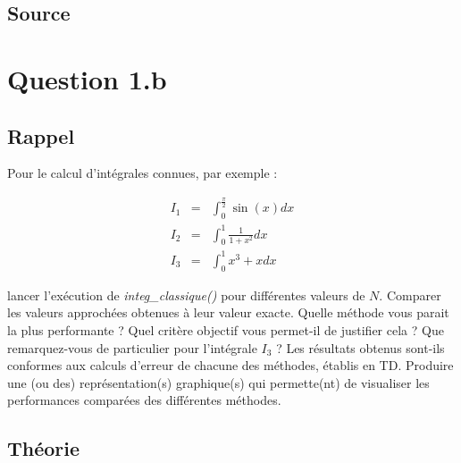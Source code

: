 \documentclass[a4paper,10pt]{report}
\begin{document}
\subsection*{Source}

\begin{center}
	

	
	
	
	
	
	
	
\end{center}

\section*{Question 1.b}

\subsection*{Rappel}

Pour le calcul d’intégrales connues, par exemple :

\begin{eqnarray}
I_1 &=& \int_{0}^{\frac{\pi}{2}}\sin(x)dx\\
I_2 &=& \int_{0}^{1}\frac{1}{1 + x^2}dx\\
I_3 &=& \int_{0}^{1}x^3 + xdx
\end{eqnarray}

lancer l’exécution de \textit{integ\_classique()} pour différentes valeurs de $N$.
Comparer les valeurs approchées obtenues à leur valeur exacte. Quelle méthode vous parait la plus performante ? Quel critère objectif vous permet-il de justifier cela ? Que remarquez-vous de particulier pour l’intégrale $I_3$ ? Les résultats obtenus sont-ils conformes aux calculs d’erreur de chacune des méthodes, établis en TD.
Produire une (ou des) représentation(s) graphique(s) qui permette(nt) de visualiser les performances comparées des différentes méthodes.

\subsection*{Théorie}
\end{document}
